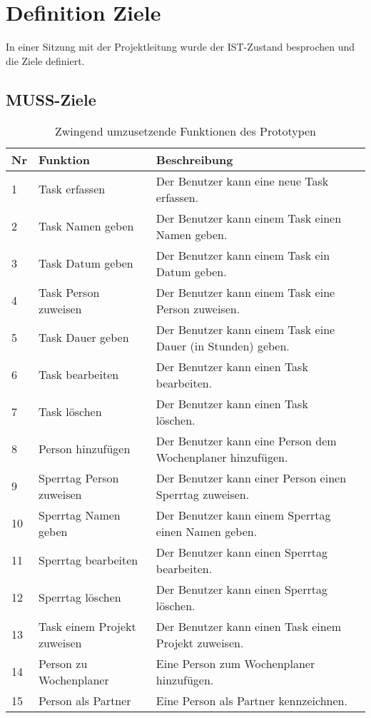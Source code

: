 \section{Definition Ziele}
In einer Sitzung mit der Projektleitung wurde der IST-Zustand besprochen und die Ziele definiert.

\subsection{MUSS-Ziele}
\begin{table}[!ht]
\begin{center}
    \begin{tabular}{llp{8cm}l}
        \toprule Nr & Funktion & Beschreibung \\
        \midrule 1 & Task erfassen & Der Benutzer kann eine neue Task erfassen. \\
        \midrule 2 & Task Namen geben & Der Benutzer kann einem Task einen Namen geben. \\
        \midrule 3 & Task Datum geben & Der Benutzer kann einem Task ein Datum geben. \\
        \midrule 4 & Task Person zuweisen & Der Benutzer kann einem Task eine Person zuweisen. \\
        \midrule 5 & Task Dauer geben & Der Benutzer kann einem Task eine Dauer (in Stunden) geben. \\
        \midrule 6 & Task bearbeiten & Der Benutzer kann einen Task bearbeiten. \\ 
        \midrule 7 & Task löschen & Der Benutzer kann einen Task löschen. \\
        \midrule 8 & Person hinzufügen & Der Benutzer kann eine Person dem Wochenplaner hinzufügen. \\
        \midrule 9 & Sperrtag Person zuweisen & Der Benutzer kann einer Person einen Sperrtag zuweisen. \\
        \midrule 10 & Sperrtag Namen geben & Der Benutzer kann einem Sperrtag einen Namen geben. \\
        \midrule 11 & Sperrtag bearbeiten & Der Benutzer kann einen Sperrtag bearbeiten.\\
        \midrule 12 & Sperrtag löschen & Der Benutzer kann einen Sperrtag löschen.\\
        \midrule 13 & Task einem Projekt zuweisen & Der Benutzer kann einen Task einem Projekt zuweisen.\\
        \midrule 14 & Person zu Wochenplaner & Eine Person zum Wochenplaner hinzufügen.\\
        \midrule 15 & Person als Partner & Eine Person als Partner kennzeichnen.\\
        \bottomrule
    \end{tabular}
    \caption{Zwingend umzusetzende Funktionen des Prototypen}
    \label{tab:muss_funktionen}
\end{center}
\end{table}
